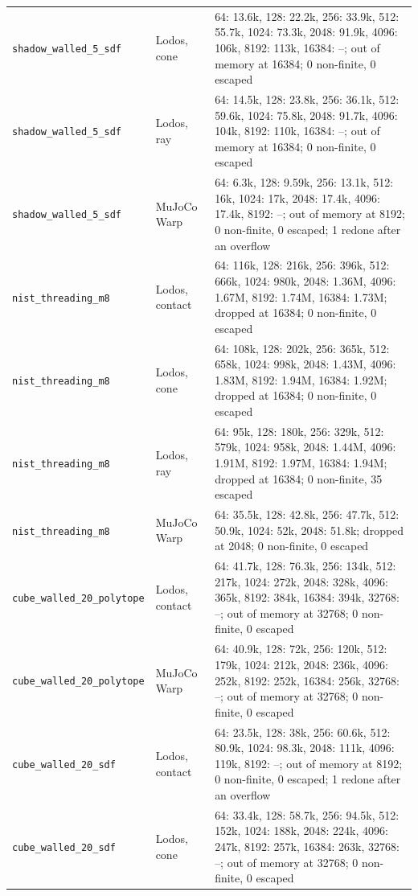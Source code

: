 \begin{longtable}{@{}llp{9.5cm}@{}}
\texttt{shadow\_walled\_5\_sdf} & Lodos, cone & 64: 13.6k, 128: 22.2k, 256: 33.9k, 512: 55.7k, 1024: 73.3k, 2048: 91.9k, 4096: 106k, 8192: 113k, 16384: --; out of memory at 16384; 0 non-finite, 0 escaped \\
\texttt{shadow\_walled\_5\_sdf} & Lodos, ray & 64: 14.5k, 128: 23.8k, 256: 36.1k, 512: 59.6k, 1024: 75.8k, 2048: 91.7k, 4096: 104k, 8192: 110k, 16384: --; out of memory at 16384; 0 non-finite, 0 escaped \\
\texttt{shadow\_walled\_5\_sdf} & MuJoCo Warp & 64: 6.3k, 128: 9.59k, 256: 13.1k, 512: 16k, 1024: 17k, 2048: 17.4k, 4096: 17.4k, 8192: --; out of memory at 8192; 0 non-finite, 0 escaped; 1 redone after an overflow \\
\texttt{nist\_threading\_m8} & Lodos, contact & 64: 116k, 128: 216k, 256: 396k, 512: 666k, 1024: 980k, 2048: 1.36M, 4096: 1.67M, 8192: 1.74M, 16384: 1.73M; dropped at 16384; 0 non-finite, 0 escaped \\
\texttt{nist\_threading\_m8} & Lodos, cone & 64: 108k, 128: 202k, 256: 365k, 512: 658k, 1024: 998k, 2048: 1.43M, 4096: 1.83M, 8192: 1.94M, 16384: 1.92M; dropped at 16384; 0 non-finite, 0 escaped \\
\texttt{nist\_threading\_m8} & Lodos, ray & 64: 95k, 128: 180k, 256: 329k, 512: 579k, 1024: 958k, 2048: 1.44M, 4096: 1.91M, 8192: 1.97M, 16384: 1.94M; dropped at 16384; 0 non-finite, 35 escaped \\
\texttt{nist\_threading\_m8} & MuJoCo Warp & 64: 35.5k, 128: 42.8k, 256: 47.7k, 512: 50.9k, 1024: 52k, 2048: 51.8k; dropped at 2048; 0 non-finite, 0 escaped \\
\texttt{cube\_walled\_20\_polytope} & Lodos, contact & 64: 41.7k, 128: 76.3k, 256: 134k, 512: 217k, 1024: 272k, 2048: 328k, 4096: 365k, 8192: 384k, 16384: 394k, 32768: --; out of memory at 32768; 0 non-finite, 0 escaped \\
\texttt{cube\_walled\_20\_polytope} & MuJoCo Warp & 64: 40.9k, 128: 72k, 256: 120k, 512: 179k, 1024: 212k, 2048: 236k, 4096: 252k, 8192: 252k, 16384: 256k, 32768: --; out of memory at 32768; 0 non-finite, 0 escaped \\
\texttt{cube\_walled\_20\_sdf} & Lodos, contact & 64: 23.5k, 128: 38k, 256: 60.6k, 512: 80.9k, 1024: 98.3k, 2048: 111k, 4096: 119k, 8192: --; out of memory at 8192; 0 non-finite, 0 escaped; 1 redone after an overflow \\
\texttt{cube\_walled\_20\_sdf} & Lodos, cone & 64: 33.4k, 128: 58.7k, 256: 94.5k, 512: 152k, 1024: 188k, 2048: 224k, 4096: 247k, 8192: 257k, 16384: 263k, 32768: --; out of memory at 32768; 0 non-finite, 0 escaped \\

\end{longtable}
